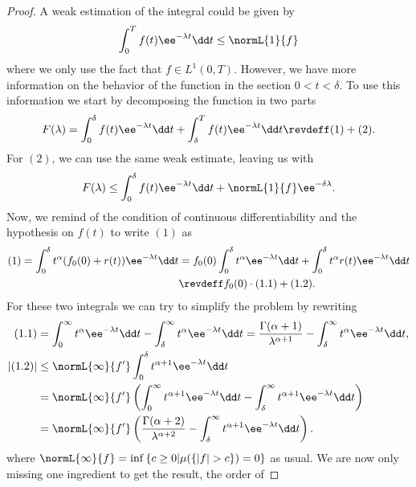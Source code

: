 \begin{proof}
	A weak estimation of the integral could be given by
	\begin{equation}
		\int_{0}^{T} f(t) \ee^{-\lambda t} \dd t \leq \normL{1}{f}
	\end{equation}
	where we only use the fact that $f \in L^1(0,T)$. However, we have more information on the behavior of the function in the section $0 < t < \delta$. To use this information we start by decomposing the function in two parts
	\begin{equation}
		F(\lambda) = \int_{0}^{\delta} f(t) \ee^{-\lambda t} \dd t + \int_{\delta}^{T} f(t) \ee^{-\lambda t} \dd t \revdeff (1) + (2).
	\end{equation}
	For $(2)$, we can use the same weak estimate, leaving us with 
	\begin{equation}
		F(\lambda) \leq \int_{0}^{\delta} f(t) \ee^{-\lambda t} \dd t + \normL{1}{f} \ee^{-\delta \lambda}.		
	\end{equation}
	Now, we remind of the condition of continuous differentiability and the hypothesis on $f(t)$ to write $(1)$ as
	\begin{align}
		(1) = \int_{0}^{\delta} t^\alpha(f_0(0) + r(t)) \ee^{-\lambda t} \dd t & = f_0(0) \int_{0}^{\delta} t^\alpha \ee^{-\lambda t} \dd t + \int_{0}^{\delta} t^\alpha r(t) \ee^{-\lambda t} \dd t \\
		& \revdeff f_0(0) \cdot (1.1) + (1.2).
	\end{align}
	For these two integrals we can try to simplify the problem by rewriting 
	\begin{align}
	(1.1) & = \int_{0}^{\infty} t^\alpha \ee^{-\lambda t} \dd t - \int_{\delta}^{\infty} t^\alpha \ee^{-\lambda t} \dd t  = \frac{\Gamma(\alpha + 1)}{\lambda^{\alpha +1}} - \int_{\delta}^{\infty} t^\alpha \ee^{-\lambda t} \dd t, \\
	|(1.2)| & \leq \normL{\infty}{f'} \int_{0}^{\delta} t^{\alpha + 1} \ee^{-\lambda t} \dd t \\ &=  \normL{\infty}{f'} \left( \int_{0}^{\infty} t^{\alpha+1} \ee^{-\lambda t} \dd t - \int_{\delta}^{\infty} t^{\alpha+1} \ee^{-\lambda t} \dd t \right) \\
	& =  \normL{\infty}{f'} \left( \frac{\Gamma(\alpha + 2)}{\lambda^{\alpha +2}} - \int_{\delta}^{\infty} t^{\alpha+1} \ee^{-\lambda t} \dd t \right).	
	\end{align}
	where  $\normL{\infty}{f} = \inf{\{ c \geq 0 | \mu(\{|f| > c\}) = 0 \}}$ as usual. We are now only missing one ingredient to get the result, the order of

\end{proof}

